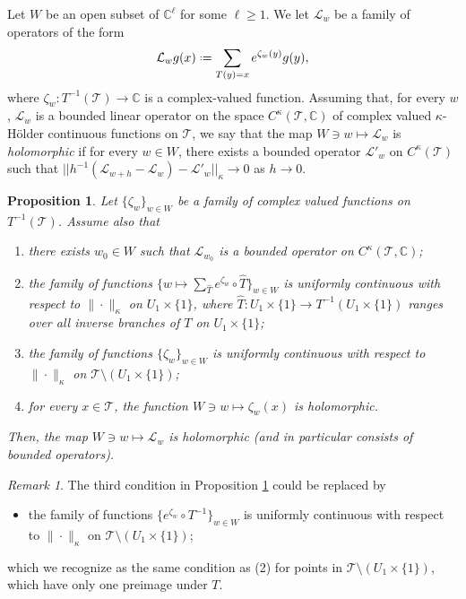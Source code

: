 \documentclass[11pt]{amsart}
\theoremstyle{plain}
\newtheorem{prop}[thm]{Proposition}
\theoremstyle{definition}
\theoremstyle{remark}
\newtheorem{rmk}[thm]{Remark}
\newcommand*{\defeq}{\mathrel{\vcenter{\baselineskip0.5ex \lineskiplimit0pt
			\hbox{\scriptsize.}\hbox{\scriptsize.}}}%
	=}
\begin{document}
\medskip

Let $W$ be an open subset of $\mathbb{C}^\ell$ for some $\ell \ge 1$. We let $\mathcal L_w$ be a family of operators of the form
\[
\mathcal L_w g (x)
\defeq
\sum_{T(y)=x} e^{\zeta_w (y)}
g (y),
\]
where $\zeta_w \colon T^{-1} (\mathcal{T}) \to \mathbb{C}$ is a complex-valued function.
Assuming
that,
for every $w$,
$\mathcal L_w$ is a bounded linear
operator on the space
$C^{\kappa}(\mathcal T, \mathbb{C})$
of complex valued $\kappa$-H\"older 
continuous functions on $\mathcal T$,
we say that 
the
map $W \ni w \mapsto \mathcal{L}_w$ 
is {\it holomorphic} if for every $w \in W$, there exists
a bounded operator
$\mathcal{L}'_w$ on $C^{\kappa} (\mathcal T)$ 
such that $||
h^{-1}  ( \mathcal{L}_{ w+h}-\mathcal{L}_w )
-\mathcal{L}'_w||_{\kappa} \to 0$ as $h\to0$.


\begin{prop}\label{p:SU-full}
Let $\{\zeta_w\}_{w \in W}$
be a family of complex valued functions 
on $T^{-1} (\mathcal T)$.
Assume also
that
\begin{enumerate}
\item there exists $w_0 \in W$
such that $\mathcal L_{{w_0}}$ is a bounded operator on
$C^{\kappa}(\mathcal T, \mathbb{C})$;

\item the 
family of
functions $\{w \mapsto \sum_{\hat T} e^{\zeta_w} \circ \hat{T}\}_{w\in W}$
is uniformly
continuous with respect to $\|\cdot\|_{\kappa}$ on 
$U_1 \times \{1\}$,
where $\hat  T:
U_1 \times \{1\}
\to
T^{-1}(
U_1 \times \{1\}
)$
ranges over all
inverse branches of $T$ on 
$U_1 \times \{1\}$;
\item 
the family of functions $\{\zeta_w\}_{w\in W}$ 
is uniformly
continuous with respect to $\|\cdot\|_{\kappa}$ on $\mathcal T\setminus
(U_1 \times \{1\})$;


\item for every $x \in \mathcal T$,
the function $W \ni w \mapsto \zeta_w(x)$ is holomorphic.
\end{enumerate}
Then, the map $W \ni w \mapsto \mathcal{L}_{w}$ 
is holomorphic (and in particular consists of bounded operators). 
\end{prop}

\begin{rmk}
The third condition in Proposition \ref{p:SU-full}
could be replaced by
\begin{itemize}
\item[(3')] 
 the family of functions $\{e^{\zeta_w} \circ T^{-1}\}_{w\in W}$ 
is uniformly
continuous with respect to $\|\cdot\|_{\kappa}$ on $\mathcal T\setminus
(U_1 \times \{1\})$;
\end{itemize}
which we recognize as the same condition as (2) for points
in
$\mathcal T \setminus 
(U_1 \times \{1\})$, which have only one preimage under $T$.
\end{rmk}
\end{document}
